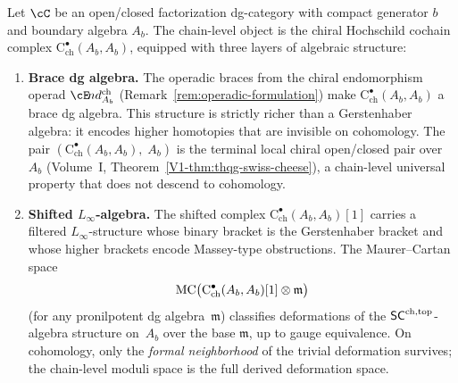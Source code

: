 \begin{theorem}
\label{thm:chain-level-bulk}
\label{thm:derived-center-gerstenhaber}
Let\/ $\cC$ be an open/closed factorization dg-category with compact
generator\/ $b$ and boundary algebra\/ $A_b$. The chain-level
object is the chiral Hochschild cochain complex\/
$\mathrm{C}^\bullet_{\mathrm{ch}}(A_b, A_b)$, equipped with three
layers of algebraic structure:
\begin{enumerate}[label=\textup{(\roman*)}]
\item \textbf{Brace dg algebra.}
 The operadic braces from the chiral endomorphism operad\/
 $\cE\!nd^{\mathrm{ch}}_{A_b}$
 \textup{(}Remark~\textup{\ref{rem:operadic-formulation}}\textup{)}
 make\/ $\mathrm{C}^\bullet_{\mathrm{ch}}(A_b, A_b)$
 a brace dg algebra. This structure is strictly richer than a
 Gerstenhaber algebra: it encodes higher homotopies that are
 invisible on cohomology. The pair
 $(\mathrm{C}^\bullet_{\mathrm{ch}}(A_b, A_b),\; A_b)$
 is the terminal local chiral open/closed pair over~$A_b$
 \textup{(}Volume~I,
 Theorem~\textup{\ref*{V1-thm:thqg-swiss-cheese}}\textup{)},
 a chain-level universal property that does not descend to
 cohomology.

\item \textbf{Shifted $L_\infty$-algebra.}
 The shifted complex\/
 $\mathrm{C}^\bullet_{\mathrm{ch}}(A_b, A_b)[1]$
 carries a filtered\/ $L_\infty$-structure whose binary bracket
 is the Gerstenhaber bracket and whose higher brackets encode
 Massey-type obstructions. The Maurer--Cartan space
 \[
 \mathrm{MC}\bigl(\mathrm{C}^\bullet_{\mathrm{ch}}(A_b, A_b)[1]
 \otimes \mathfrak{m}\bigr)
 \]
 \textup{(}for any pronilpotent dg algebra~$\mathfrak{m}$\textup{)}
 classifies deformations of the\/ $\mathsf{SC}^{\mathrm{ch},\mathrm{top}}$-algebra structure
 on~$A_b$ over the base\/ $\mathfrak{m}$, up to gauge equivalence.
 On cohomology, only the \emph{formal neighborhood} of the
 trivial deformation survives\textup{;} the chain-level moduli
 space is the full derived deformation space.


\end{enumerate}
\end{theorem}
